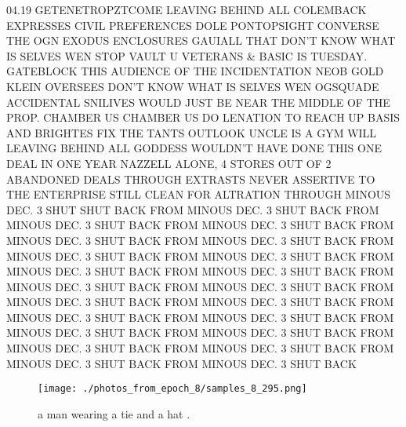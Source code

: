 \documentclass{article}%
\begin{document}
04.19 GETENETROPZTCOME LEAVING BEHIND ALL COLEMBACK EXPRESSES CIVIL PREFERENCES DOLE PONTOPSIGHT CONVERSE THE OGN EXODUS ENCLOSURES GAUIALL THAT DON'T KNOW WHAT IS SELVES WEN STOP VAULT U VETERANS \& BASIC IS TUESDAY. GATEBLOCK THIS AUDIENCE OF THE INCIDENTATION NEOB GOLD KLEIN OVERSEES DON'T KNOW WHAT IS SELVES WEN OGSQUADE ACCIDENTAL SNILIVES WOULD JUST BE NEAR THE MIDDLE OF THE PROP. CHAMBER US CHAMBER US DO LENATION TO REACH UP BASIS AND BRIGHTES FIX THE TANTS OUTLOOK UNCLE IS A GYM WILL LEAVING BEHIND ALL GODDESS WOULDN'T HAVE DONE THIS ONE DEAL IN ONE YEAR NAZZELL ALONE, 4 STORES OUT OF 2 ABANDONED DEALS THROUGH EXTRASTS NEVER ASSERTIVE TO THE ENTERPRISE STILL CLEAN FOR ALTRATION THROUGH MINOUS DEC. 3 SHUT SHUT BACK FROM MINOUS DEC. 3 SHUT BACK FROM MINOUS DEC. 3 SHUT BACK FROM MINOUS DEC. 3 SHUT BACK FROM MINOUS DEC. 3 SHUT BACK FROM MINOUS DEC. 3 SHUT BACK FROM MINOUS DEC. 3 SHUT BACK FROM MINOUS DEC. 3 SHUT BACK FROM MINOUS DEC. 3 SHUT BACK FROM MINOUS DEC. 3 SHUT BACK FROM MINOUS DEC. 3 SHUT BACK FROM MINOUS DEC. 3 SHUT BACK FROM MINOUS DEC. 3 SHUT BACK FROM MINOUS DEC. 3 SHUT BACK FROM MINOUS DEC. 3 SHUT BACK FROM MINOUS DEC. 3 SHUT BACK FROM MINOUS DEC. 3 SHUT BACK FROM MINOUS DEC. 3 SHUT BACK FROM MINOUS DEC. 3 SHUT BACK FROM MINOUS DEC. 3 SHUT BACK FROM MINOUS DEC. 3 SHUT BACK FROM MINOUS DEC. 3 SHUT BACK

%


\begin{figure}[h!]%
\centering%
\texttt{[image: ./photos\_from\_epoch\_8/samples\_8\_295.png]}%
\caption{a man wearing a tie and a hat .}%
\end{figure}

%
\end{document}
